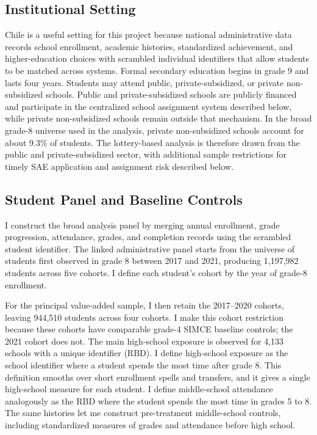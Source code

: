 \documentclass[a4paper, article, english, oneside, unknownkeysallowed, 12pt]{memoir}
\begin{document}
\subsection{Institutional Setting}

Chile is a useful setting for this project because national administrative data records school enrollment, academic histories, standardized achievement, and higher-education choices with scrambled individual identifiers that allow students to be matched across systems.
Formal secondary education begins in grade 9 and lasts four years.
Students may attend public, private-subsidized, or private non-subsidized schools.
Public and private-subsidized schools are publicly financed and participate in the centralized school assignment system described below, while private non-subsidized schools remain outside that mechanism.
In the broad grade-8 universe used in the analysis, private non-subsidized schools account for about 9.3\% of students.
The lottery-based analysis is therefore drawn from the public and private-subsidized sector, with additional sample restrictions for timely SAE application and assignment risk described below.

\subsection{Student Panel and Baseline Controls}

I construct the broad analysis panel by merging annual enrollment, grade progression, attendance, grades, and completion records using the scrambled student identifier.
The linked administrative panel starts from the universe of students first observed in grade 8 between 2017 and 2021, producing 1,197,982 students across five cohorts.
I define each student's cohort by the year of grade-8 enrollment. 

For the principal value-added sample, I then retain the 2017--2020 cohorts, leaving 944,510 students across four cohorts.
I make this cohort restriction because these cohorts have comparable grade-4 SIMCE baseline controls; the 2021 cohort does not.
The main high-school exposure is observed for 4,133 schools with a unique identifier (RBD).
I define high-school exposure as the school identifier where a student spends the most time after grade 8.
This definition smooths over short enrollment spells and transfers, and it gives a single high-school measure for each student.
I define middle-school attendance analogously as the RBD where the student spends the most time in grades 5 to 8.
The same histories let me construct pre-treatment middle-school controls, including standardized measures of grades and attendance before high school.
\end{document}
